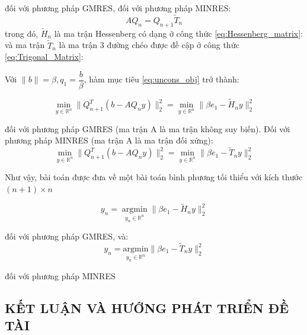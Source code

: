 \documentclass[14pt, a4paper]{article}
\numberwithin{equation}{section}
\numberwithin{algorithm}{section}
\numberwithin{figure}{section}
\numberwithin{dl}{section}
\numberwithin{md}{section}
\numberwithin{bd}{section}
\numberwithin{dn}{section}
\begin{document}
đối với phương pháp GMRES, đối với phương pháp MINRES:
\begin{equation}
    AQ_n = Q_{n+1} \widetilde{T}_n
\end{equation}
trong đó, $\widetilde{H}_n$ là ma trận Hessenberg có dạng ở công thức \ref{eq:Hessenberg_matrix}:
và ma trận $\widetilde{T}_n$ là ma trận 3 đường chéo được đề cập ở công thức \ref{eq:Trigonal_Matrix}:

Với $\lVert b \rVert = \beta, q_1 = \dfrac{b}{\beta}$, hàm mục tiêu \eqref{eq:uncons_obj} trở thành:

\begin{equation}
    \min_{y \in \mathbb{R}^{n}}  \lVert Q_{n+1}^T(b - AQ_n y) \rVert_2^2=\min_{y \in \mathbb{R}^{n}} \lVert \beta e_1 - \widetilde{H}_n y\rVert_2^2
\end{equation}

đối với phương pháp GMRES (ma trận A là ma trận không suy biến).
Đối với phương pháp MINRES (ma trận A là ma trận đối xứng):
\begin{equation}
    \min_{y \in \mathbb{R}^{n}}  \lVert Q_{n+1}^T(b - AQ_n y) \rVert_2^2=\min_{y \in \mathbb{R}^{n}} \lVert \beta e_1 - \widetilde{T}_n y\rVert_2^2
\end{equation}

Như vậy, bài toán được đưa về một bài toán bình phương tối thiểu với kích thước $(n+1)\times n$

\begin{equation}
    y_n = \operatorname*{argmin}_{y_n \in \mathbb{R}^{n}} \lVert \beta e_1 - \widetilde{H}_n y\rVert_2^2
\end{equation}

đối với phương pháp GMRES, và:
\begin{equation}
    y_n = \underset{y_n \in \mathbb{R}^{n}}{\mathrm{argmin}} \lVert \beta e_1 - \widetilde{T}_n y\rVert_2^2
\end{equation}

đối với phương pháp MINRES

\newpage
\begin{center}
    \section*{KẾT LUẬN VÀ HƯỚNG PHÁT TRIỂN ĐỀ TÀI}
\end{center}

\newpage
{}
%
%
\printbibliography[title={TÀI LIỆU THAM KHẢO}]

\end{document}
